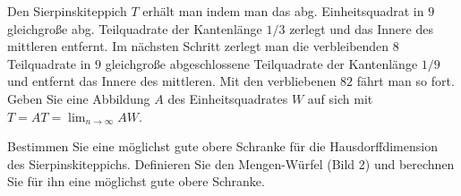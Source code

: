 
\begin{exercise}

Den Sierpinskiteppich $T$ erhält man indem man das abg. Einheitsquadrat in $9$ gleichgroße abg. Teilquadrate der Kantenlänge $1/3$ zerlegt und das Innere des mittleren entfernt.
Im nächsten Schritt zerlegt man die verbleibenden $8$ Teilquadrate in $9$ gleichgroße abgeschlossene Teilquadrate der Kantenlänge $1/9$ und entfernt das Innere des mittleren.
Mit den verbliebenen $82$ fährt man so fort.
Geben Sie eine Abbildung $A$ des Einheitsquadrates $W$ auf sich mit $T = A T = \lim_{n \to \infty} A W$.


Bestimmen Sie eine möglichst gute obere Schranke für die Hausdorffdimension des Sierpinskiteppichs.
Definieren Sie den Mengen-Würfel (Bild 2) und berechnen Sie für ihn eine möglichst gute obere Schranke.

\end{exercise}


